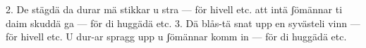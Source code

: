 2.  De stägdä da durar mä stikkar u stra — för hivell etc.
    att intä ʃömännar ti daim skuddä ga — för di huggädä etc.
3.  Dä blås-tä snat upp en syvästeli vinn — för hivell etc.
    U dur-ar spragg upp u ʃömännar komm in — för di huggädä etc.
